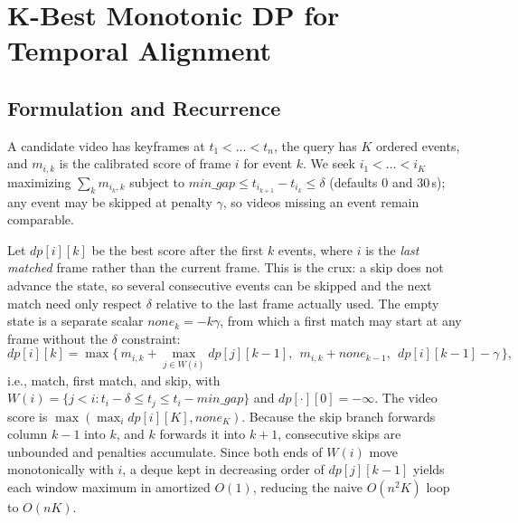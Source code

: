 \documentclass[runningheads]{llncs}
\begin{document}
\section{K-Best Monotonic DP for Temporal Alignment}
\label{sec:dp}
\subsection{Formulation and Recurrence}
A candidate video has keyframes at $t_1<\dots<t_n$, the query has $K$ ordered events, and $m_{i,k}$ is the calibrated score of frame $i$ for event $k$. We seek $i_1<\dots<i_K$ maximizing $\sum_k m_{i_k,k}$ subject to $\mathit{min\_gap}\le t_{i_{k+1}}-t_{i_k}\le\delta$ (defaults 0 and 30\,s); any event may be skipped at penalty $\gamma$, so videos missing an event remain comparable.

Let $dp[i][k]$ be the best score after the first $k$ events, where $i$ is the \emph{last matched} frame rather than the current frame. This is the crux: a skip does not advance the state, so several consecutive events can be skipped and the next match need only respect $\delta$ relative to the last frame actually used. The empty state is a separate scalar $\mathit{none}_k=-k\gamma$, from which a first match may start at any frame without the $\delta$ constraint:
\begin{equation}
dp[i][k]=\max\big\{\,m_{i,k}+\max_{j\in W(i)}dp[j][k-1],\ \ m_{i,k}+\mathit{none}_{k-1},\ \ dp[i][k-1]-\gamma\,\big\},
\label{eq:dp}
\end{equation}
i.e., match, first match, and skip, with $W(i)=\{j<i: t_i-\delta\le t_j\le t_i-\mathit{min\_gap}\}$ and $dp[\cdot][0]=-\infty$. The video score is $\max(\max_i dp[i][K],\mathit{none}_K)$. Because the skip branch forwards column $k-1$ into $k$, and $k$ forwards it into $k+1$, consecutive skips are unbounded and penalties accumulate. Since both ends of $W(i)$ move monotonically with $i$, a deque kept in decreasing order of $dp[j][k-1]$ yields each window maximum in amortized $O(1)$, reducing the naive $O(n^2K)$ loop to $O(nK)$.
\end{document}
